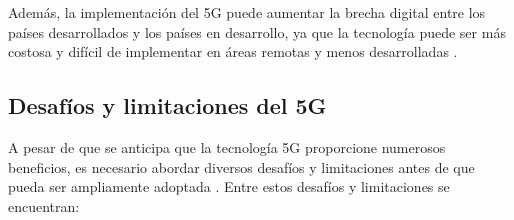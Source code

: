 \documentclass[12pt]{article}
\begin{document}
            Además, la implementación del 5G puede aumentar la brecha digital entre los países desarrollados y los países en desarrollo, ya que la tecnología puede ser más costosa y difícil de implementar en áreas remotas y menos desarrolladas \cite{davidson2019impact}.
            
        \subsection{Desafíos y limitaciones del 5G}

            A pesar de que se anticipa que la tecnología 5G proporcione numerosos beneficios, es necesario abordar diversos desafíos y limitaciones antes de que pueda ser ampliamente adoptada \cite{dahlman20185g}. Entre estos desafíos y limitaciones se encuentran:
\end{document}
